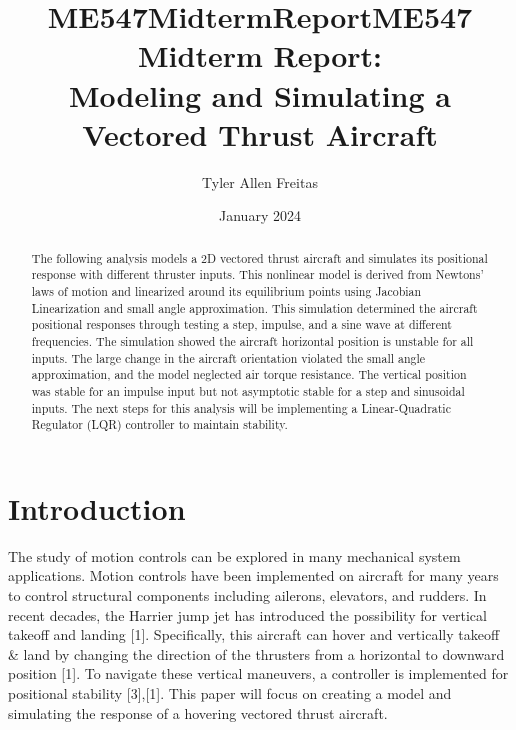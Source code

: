 \documentclass[conference]{IEEEtran}
\begin{document}
\title{ME547MidtermReport}
\author{Tyler Allen Freitas}
\date{January 2024}

\title{ME547 Midterm Report: \\ Modeling and Simulating a Vectored Thrust Aircraft}

\author{
}

\maketitle

\begin{abstract}
The following analysis models a 2D vectored thrust aircraft and simulates its positional response with different thruster inputs. This nonlinear model is derived from Newtons' laws of motion and linearized around its equilibrium points using Jacobian Linearization and small angle approximation. This simulation determined the aircraft positional responses through testing a step, impulse, and a sine wave at different frequencies. The simulation showed the aircraft horizontal position is unstable for all inputs. The large change in the aircraft orientation violated the small angle approximation, and the model neglected air torque resistance. The vertical position was stable for an impulse input but not asymptotic stable for a step and sinusoidal inputs. The next steps for this analysis will be implementing a Linear-Quadratic Regulator (LQR) controller to maintain stability.
\end{abstract}


\section{Introduction}
The study of motion controls can be explored in many mechanical system applications. Motion controls have been implemented on aircraft for many years to control structural components including ailerons, elevators, and rudders. In recent decades, the Harrier jump jet has introduced the possibility for vertical takeoff and landing [1]. Specifically, this aircraft can hover and vertically takeoff \& land by changing the direction of the thrusters from a horizontal to downward position [1]. To navigate these vertical maneuvers, a controller is implemented for positional stability [3],[1]. This paper will focus on creating a model and simulating the response of a hovering vectored thrust aircraft.  
\end{document}

